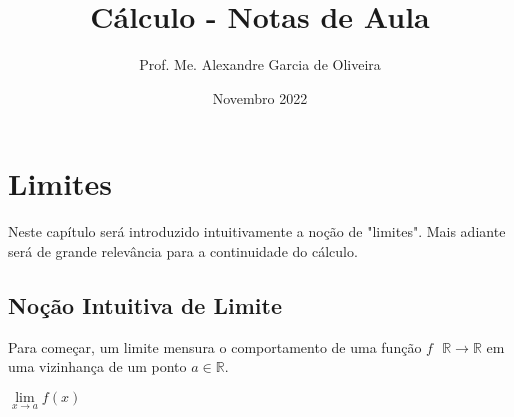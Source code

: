 \documentclass{book}
\title{Cálculo - Notas de Aula}
\author{Prof. Me. Alexandre Garcia de Oliveira}
\date{Novembro 2022}
\numberwithin{defn}{chapter}
\numberwithin{exe}{chapter}
\numberwithin{ex}{chapter}
\numberwithin{obs}{chapter}
\numberwithin{fato}{chapter}
\numberwithin{resp}{chapter}
\begin{document}
\maketitle


\chapter{Limites}

Neste capítulo será introduzido intuitivamente a noção de "limites". Mais adiante será de grande relevância para a continuidade do cálculo.

\section{Noção Intuitiva de Limite}
Para começar, um limite mensura o comportamento de uma função $f \text{ }\mathbb R \rightarrow \mathbb R$ em uma vizinhança de um ponto $a \in\mathbb R$.
\begin{center} $\lim\limits_{x\to a}f(x)$ \end{center}
\end{document}
